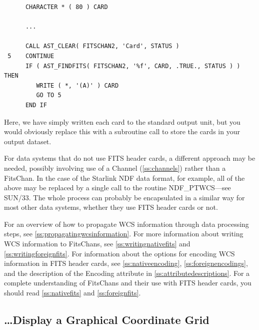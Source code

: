 \documentclass[twoside,11pt]{article}
\newcommand{\htmlref}[2]{#1}
\newcommand{\xref}[3]{#1}
\newcommand{\appref}[1]{Appendix~\ref{#1}}
\newcommand{\secref}[1]{\S\ref{#1}}
\renewcommand{\appref}[1]{\ref{#1}}
\renewcommand{\secref}[1]{\ref{#1}}
\begin{document}
\small
\begin{verbatim}
      CHARACTER * ( 80 ) CARD

      ...

      CALL AST_CLEAR( FITSCHAN2, 'Card', STATUS )
 5    CONTINUE
      IF ( AST_FINDFITS( FITSCHAN2, '%f', CARD, .TRUE., STATUS ) ) THEN
         WRITE ( *, '(A)' ) CARD
         GO TO 5
      END IF
\end{verbatim}
\normalsize

Here, we have simply written each card to the standard output unit,
but you would obviously replace this with a subroutine call to store
the cards in your output dataset.

For data systems that do not use FITS header cards, a different
approach may be needed, possibly involving use of a \htmlref{Channel}{Channel}
(\secref{ss:channels}) rather than a FitsChan.  In the case of the
Starlink NDF data format, for example, all of the above may be
replaced by a single call to the routine
\xref{NDF\_PTWCS}{sun33}{NDF_PTWCS}---see \xref{SUN/33}{sun33}{}. The
whole process can probably be encapsulated in a similar way for most
other data systems, whether they use FITS header cards or not.

For an overview of how to propagate WCS information through data
processing steps, see \secref{ss:propagatingwcsinformation}.  For more
information about writing WCS information to FitsChans, see
\secref{ss:writingnativefits} and \secref{ss:writingforeignfits}.  For
information about the options for encoding WCS information in FITS
header cards, see \secref{ss:nativeencoding},
\secref{ss:foreignencodings}, and the description of the \htmlref{Encoding}{Encoding}
attribute in \appref{ss:attributedescriptions}.  For a complete
understanding of FitsChans and their use with FITS header cards, you
should read \secref{ss:nativefits} and \secref{ss:foreignfits}.

\subsection{\label{ss:howtoplotgrid}\ldots Display a Graphical Coordinate Grid}
\end{document}
